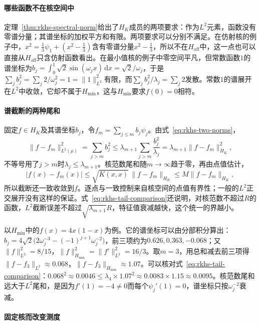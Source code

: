 \paragraph{哪些函数不在核空间中}

定理~\ref{thm:rkhs-spectral-norm}给出了$H_K$成员的两项要求：作为$L^2$元素，函数没有零谱分量；其谱坐标的加权平方和有限。两项要求可以分别不满足。在仿射核的例子中，$x^2=\tfrac13\psi_1+(x^2-\tfrac13)$含有零谱分量$x^2-\tfrac13$，所以不在$H_{\mathrm{aff}}$中，这一点也可以直接从$H_{\mathrm{aff}}$只含仿射函数看出。在最小值核的例子中零空间平凡，但常数函数$1$的谱坐标为$b_j=\int_0^1\sqrt2\sin(\omega_jx)\,\mathrm dx=\sqrt2/\omega_j$，于是$\sum_jb_j^2=\sum_j2/\omega_j^2=1=\|1\|_{L^2}^2$有限，而$\sum_jb_j^2/\lambda_j=\sum_j2$发散。常数$1$的谱展开在$L^2$中收敛，它却不属于$H_{\min}$，这与$H_{\min}$要求$f(0)=0$相符。

\paragraph{谱截断的两种尾和}

固定$f\in H_K$及其谱坐标$b_j$，令$f_m=\sum_{j\le m}b_j\psi_j$。由式~\eqref{eq:rkhs-two-norms}，
\begin{equation}
\|f-f_m\|_{L^2(\mu)}^2=\sum_{j>m}b_j^2\le\lambda_{m+1}\sum_{j>m}\frac{b_j^2}{\lambda_j}=\lambda_{m+1}\|f-f_m\|_{H_K}^2 ,
\label{eq:rkhs-tail-comparison}
\end{equation}
不等号用了$j>m$时$\lambda_j\le\lambda_{m+1}$。核范数尾和随$m\to\infty$趋于零，再由点值估计，
\[
|f(x)-f_m(x)|\le\sqrt{K(x,x)}\,\|f-f_m\|_{H_K}\le M\|f-f_m\|_{H_K},
\]
所以截断还一致收敛到$f$。逐点与一致控制来自核空间的点值有界性；一般的$L^2$正交展开没有这样的保证。式~\eqref{eq:rkhs-tail-comparison}还说明，对核范数不超过$R$的函数，$L^2$截断误差不超过$\sqrt{\lambda_{m+1}}R$，特征值衰减越快，这个统一的界越小。

以$H_{\min}$中的$f(x)=4x(1-x)$为例。它的谱坐标可以由分部积分算出：$b_j=4\sqrt2\bigl(2\omega_j^{-3}-(-1)^{j+1}\omega_j^{-2}\bigr)$，前三项约为$0.626,0.363,-0.068$；又$\|f\|_{L^2}^2=8/15$，$\|f\|_{H_{\min}}^2=\|f'\|_{L^2}^2=16/3$。取$m=3$，用总和减去前三项得$\|f-f_3\|_{L^2}\approx0.068$，$\|f-f_3\|_{H_{\min}}\approx1.07$。可以核对式~\eqref{eq:rkhs-tail-comparison}：$0.068^2\approx0.0046\le\lambda_4\times1.07^2\approx0.0083\times1.15\approx0.0095$。核范数尾和远大于$L^2$尾和，是因为$f'(1)=-4\ne0$而每个$\psi_j'(1)=0$，谱坐标只按$\omega_j^{-2}$衰减。

\paragraph{固定核而改变测度}

